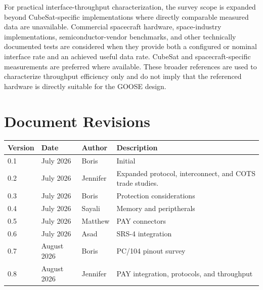 \documentclass[10pt]{../datasheet}
\begin{document}
For practical interface-throughput characterization, the survey scope is expanded
beyond CubeSat-specific implementations where directly comparable measured data
are unavailable. Commercial spacecraft hardware, space-industry implementations,
semiconductor-vendor benchmarks, and other technically documented tests are
considered when they provide both a configured or nominal interface rate and an
achieved useful data rate. CubeSat and spacecraft-specific measurements are
preferred where available. These broader references are used to characterize
throughput efficiency only and do not imply that the referenced hardware is
directly suitable for the GOOSE design.

\section{Document Revisions}

\begin{center}
  \renewcommand{\arraystretch}{1.2}
  \begin{tabularx}{\columnwidth}{|l|l|l|X|}
    \hline
    \textbf{Version} & \textbf{Date} & \textbf{Author} & \textbf{Description}                                     \\ \hline
    0.1              & July 2026     & Boris           & Initial                                                  \\ \hline
    0.2              & July 2026     & Jennifer        & Expanded protocol, interconnect, and COTS trade studies. \\ \hline
    0.3              & July 2026     & Boris           & Protection considerations                                \\ \hline
    0.4              & July 2026     & Sayali          & Memory and periptherals                                  \\ \hline
    0.5              & July 2026     & Matthew         & PAY connectors                                           \\ \hline
    0.6              & July 2026     & Asad            & SRS-4 integration                                        \\ \hline
    0.7              & August 2026   & Boris           & PC/104 pinout survey                                     \\ \hline
    0.8              & August 2026   & Jennifer        & PAY integration, protocols, and throughput               \\ \hline
  \end{tabularx}
\end{center}
\end{document}
